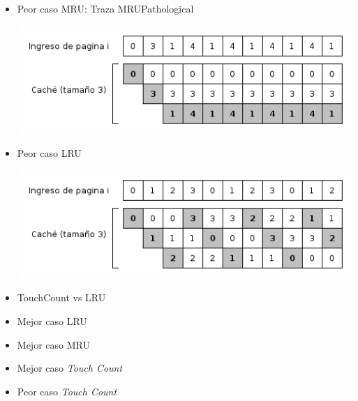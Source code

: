\documentclass[11pt, a4paper, spanish]{article}
\begin{document}
\begin{itemize}
	\item{ Peor caso MRU: Traza MRUPathological
	}
		\begin{center}
		\includegraphics[scale=0.65]{diagramas/MRUPathological.png}\\
		\end{center}

	\item{ Peor caso LRU}
		\begin{center}
		\includegraphics[scale=0.65]{diagramas/LRUPathological.png}\\
		\end{center}

	\item{ TouchCount vs LRU}
	\item{ Mejor caso LRU}
	\item{ Mejor caso MRU}
	\item{ Mejor caso \textit{Touch Count}}
	\item{ Peor caso \textit{Touch Count}}
\end{itemize}
\end{document}
